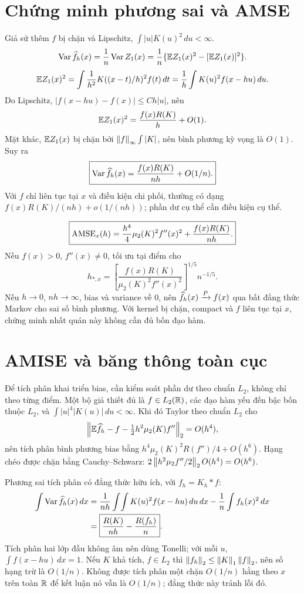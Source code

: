 \section{Chứng minh phương sai và AMSE}
Giả sử thêm $f$ bị chặn và Lipschitz, $\int|u|K(u)^2\,du<\infty$.
\[
\operatorname{Var}\widehat f_h(x)=\frac1n\operatorname{Var} Z_1(x)
=\frac1n\{\mathbb E Z_1(x)^2-[\mathbb E Z_1(x)]^2\}.
\]
\[
\mathbb E Z_1(x)^2=\int\frac1{h^2}K((x-t)/h)^2f(t)\,dt
=\frac1h\int K(u)^2f(x-hu)\,du.
\]
Do Lipschitz, $|f(x-hu)-f(x)|\leq C h|u|$, nên
\[
\mathbb E Z_1(x)^2=\frac{f(x)R(K)}h+O(1).
\]
Mặt khác, $\mathbb E Z_1(x)$ bị chặn bởi
$\left\lVert f\right\rVert_\infty\int|K|$, nên bình phương kỳ vọng là $O(1)$.
Suy ra
\[
\boxed{\operatorname{Var}\widehat f_h(x)=\frac{f(x)R(K)}{nh}+O(1/n).}
\]
Với $f$ chỉ liên tục tại $x$ và điều kiện chi phối, thường có dạng
$f(x)R(K)/(nh)+o(1/(nh))$; phần dư cụ thể cần điều kiện cụ thể.

\[
\boxed{\operatorname{AMSE}_x(h)=\frac{h^4}{4}\mu_2(K)^2f''(x)^2
+\frac{f(x)R(K)}{nh}.}
\]
Nếu $f(x)>0$, $f''(x)\ne0$, tối ưu tại điểm cho
\[
h_{*,x}=\left[\frac{f(x)R(K)}{\mu_2(K)^2f''(x)^2}\right]^{1/5}n^{-1/5}.
\]
Nếu $h\to0$, $nh\to\infty$, bias và variance về 0,
nên $\widehat f_h(x)\xrightarrow P f(x)$ qua bất đẳng thức Markov cho sai số
bình phương. Với kernel bị chặn, compact và $f$ liên tục tại $x$,
chứng minh nhất quán này không cần đủ bốn đạo hàm.

\section{AMISE và băng thông toàn cục}
Để tích phân khai triển bias, cần kiểm soát phần dư theo chuẩn $L_2$,
không chỉ theo từng điểm. Một bộ giả thiết đủ là $f\in L_2(\mathbb R)$,
các đạo hàm yếu đến bậc bốn thuộc $L_2$, và
$\int|u|^4|K(u)|\,du<\infty$. Khi đó Taylor theo chuẩn $L_2$ cho
\[
\left\lVert \mathbb E\widehat f_h-f-\tfrac12h^2\mu_2(K)f''\right\rVert_2=O(h^4),
\]
nên tích phân bình phương bias bằng
$h^4\mu_2(K)^2R(f'')/4+O(h^6)$.
Hạng chéo được chặn bằng Cauchy--Schwarz:
$2\left\lVert h^2\mu_2f''/2\right\rVert_2O(h^4)=O(h^6)$.

Phương sai tích phân có đẳng thức hữu ích, với $f_h=K_h*f$:
\begin{align*}
\int\operatorname{Var}\widehat f_h(x)\,dx
&=\frac1{nh}\int\!\int K(u)^2 f(x-hu)\,du\,dx
-\frac1n\int f_h(x)^2\,dx\\
&=\boxed{\frac{R(K)}{nh}-\frac{R(f_h)}n}.
\end{align*}
Tích phân hai lớp đầu không âm nên dùng Tonelli; với mỗi $u$,
$\int f(x-hu)\,dx=1$. Nếu $K$ khả tích, $f\in L_2$ thì
$\left\lVert f_h\right\rVert_2\leq\left\lVert K\right\rVert_1\left\lVert f\right\rVert_2$, nên số hạng trừ là $O(1/n)$.
Không được tích phân một chặn $O(1/n)$ hằng theo $x$ trên toàn $\mathbb R$
để kết luận nó vẫn là $O(1/n)$; đẳng thức này tránh lỗi đó.

